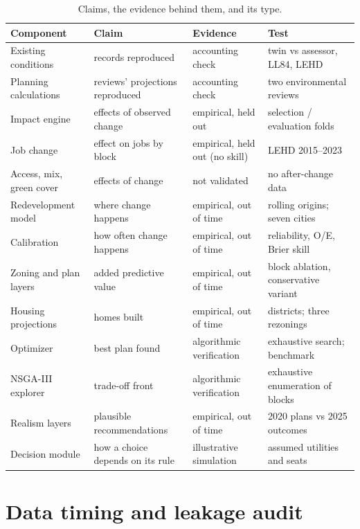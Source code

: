 \documentclass[10pt]{article}
\begin{document}
\begin{table}[t]
\centering
\small
\setlength{\tabcolsep}{4pt}
\caption{Claims, the evidence behind them, and its type.}
\label{tab:s-evidence}
\begin{tabular}{llll}
\toprule
Component & Claim & Evidence & Test \\
\midrule
Existing conditions & records reproduced & accounting check & twin vs assessor, LL84, LEHD \\
Planning calculations & reviews' projections reproduced & accounting check & two environmental reviews \\
Impact engine & effects of observed change & empirical, held out & selection / evaluation folds \\
Job change & effect on jobs by block & empirical, held out (no skill) & LEHD 2015--2023 \\
Access, mix, green cover & effects of change & not validated & no after-change data \\
Redevelopment model & where change happens & empirical, out of time & rolling origins; seven cities \\
Calibration & how often change happens & empirical, out of time & reliability, O/E, Brier skill \\
Zoning and plan layers & added predictive value & empirical, out of time & block ablation, conservative variant \\
Housing projections & homes built & empirical, out of time & districts; three rezonings \\
Optimizer & best plan found & algorithmic verification & exhaustive search; benchmark \\
NSGA-III explorer & trade-off front & algorithmic verification & exhaustive enumeration of blocks \\
Realism layers & plausible recommendations & empirical, out of time & 2020 plans vs 2025 outcomes \\
Decision module & how a choice depends on its rule & illustrative simulation & assumed utilities and seats \\
\bottomrule
\end{tabular}
\end{table}

\section{Data timing and leakage audit}\label{s:leakage}
\end{document}
